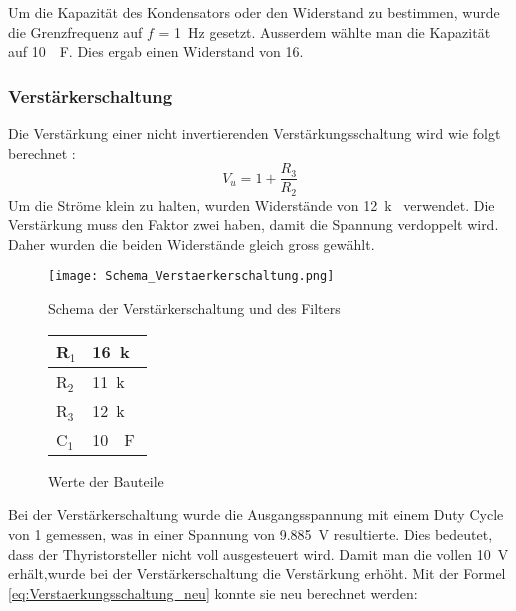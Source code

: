 Um die Kapazität des Kondensators oder den Widerstand zu bestimmen, wurde die Grenzfrequenz auf $f$ = \SI{1}{Hz} gesetzt. Ausserdem wählte man die Kapazität auf \SI{10}{\mu F}. Dies ergab einen Widerstand von \SI{16}{\Omega}. 




\subsubsection*{Verstärkerschaltung}
Die Verstärkung einer nicht invertierenden Verstärkungsschaltung wird wie folgt berechnet \cite{Verstaerker}:
\begin{equation}\label{eq:Verstärkerschaltung}
V_u = 1 + \frac{R_3}{R_2}
\end{equation}
Um die Ströme klein zu halten, wurden Widerstände von \SI{12}{k\Omega} verwendet. Die Verstärkung muss den Faktor zwei haben, damit die Spannung verdoppelt wird. Daher wurden die beiden Widerstände gleich gross gewählt.


\newpage
\begin{figure}[ht!]  
	\centering 
	\begin{minipage}[t]{.76\textwidth} \centering 
		\centering
		\texttt{[image: Schema\_Verstaerkerschaltung.png]}	
		\caption{Schema der Verstärkerschaltung und des Filters}\label{fig:Verstaerkerschaltung}
	\end{minipage}	
	\begin{minipage}[b]{.23\textwidth}
		\centering
		\begin{tabular}{|l|l|}
			\hline
			R$_1$ & \SI{16}{k\Omega} 	\\ 	\hline
			R$_2$ & \SI{11}{k\Omega} 	\\ 	\hline
			R$_3$ & \SI{12}{k\Omega} 	\\	\hline
			C$_1$ & \SI{10}{\mu F} 		\\	\hline
		\end{tabular}
		\caption{Werte der Bauteile}
		\label{tab:Verstaerkerschaltung}
	\end{minipage}
\end{figure} 



Bei der Verstärkerschaltung wurde die Ausgangsspannung mit einem Duty Cycle von 1 gemessen, was in einer Spannung von \SI{9.885}{V} resultierte. Dies bedeutet, dass der Thyristorsteller nicht voll ausgesteuert wird. Damit man die vollen \SI{10}{V} erhält,wurde bei der Verstärkerschaltung die Verstärkung erhöht. Mit der Formel \ref{eq:Verstaerkungsschaltung_neu} konnte sie neu berechnet werden:

